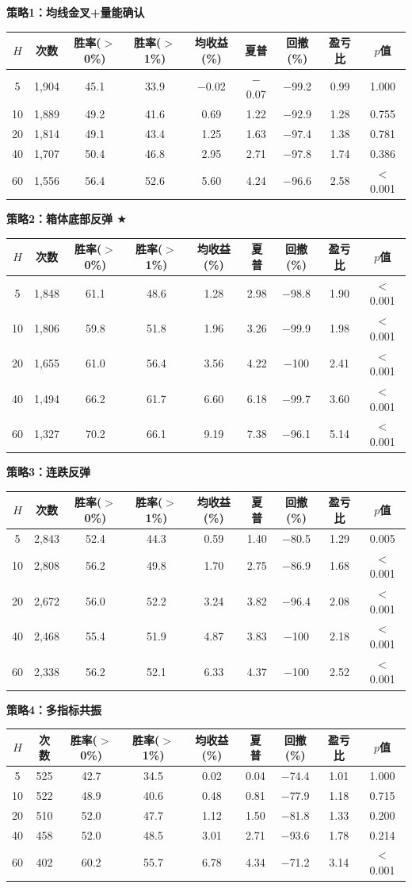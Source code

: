 \documentclass[12pt,a4paper]{ctexart}
\numberwithin{figure}{section}
\numberwithin{table}{section}
\begin{document}
\newcommand{\resulttable}[1]{%
\begin{center}
\scriptsize
\setlength{\tabcolsep}{3pt}
\begin{tabularx}{\textwidth}{c c c c c c c c c}
\toprule
$H$ & 次数 & 胜率($>$0\%) & 胜率($>$1\%) & 均收益(\%) & 夏普 & 回撤(\%) & 盈亏比 & $p$值 \\
\midrule
#1
\bottomrule
\end{tabularx}
\end{center}
}

\noindent\textbf{策略1：均线金叉+量能确认}
\resulttable{
5  & 1,904 & 45.1 & 33.9 & $-$0.02 & $-$0.07 & $-$99.2 & 0.99 & 1.000 \\
10 & 1,889 & 49.2 & 41.6 & 0.69 & 1.22 & $-$92.9 & 1.28 & 0.755 \\
20 & 1,814 & 49.1 & 43.4 & 1.25 & 1.63 & $-$97.4 & 1.38 & 0.781 \\
40 & 1,707 & 50.4 & 46.8 & 2.95 & 2.71 & $-$97.8 & 1.74 & 0.386 \\
60 & 1,556 & 56.4 & 52.6 & 5.60 & 4.24 & $-$96.6 & 2.58 & $<$0.001 \\
}

\noindent\textbf{策略2：箱体底部反弹 $\bigstar$}
\resulttable{
5  & 1,848 & 61.1 & 48.6 & 1.28 & 2.98 & $-$98.8 & 1.90 & $<$0.001 \\
10 & 1,806 & 59.8 & 51.8 & 1.96 & 3.26 & $-$99.9 & 1.98 & $<$0.001 \\
20 & 1,655 & 61.0 & 56.4 & 3.56 & 4.22 & $-$100  & 2.41 & $<$0.001 \\
40 & 1,494 & 66.2 & 61.7 & 6.60 & 6.18 & $-$99.7 & 3.60 & $<$0.001 \\
60 & 1,327 & 70.2 & 66.1 & 9.19 & 7.38 & $-$96.1 & 5.14 & $<$0.001 \\
}

\noindent\textbf{策略3：连跌反弹}
\resulttable{
5  & 2,843 & 52.4 & 44.3 & 0.59 & 1.40 & $-$80.5 & 1.29 & 0.005 \\
10 & 2,808 & 56.2 & 49.8 & 1.70 & 2.75 & $-$86.9 & 1.68 & $<$0.001 \\
20 & 2,672 & 56.0 & 52.2 & 3.24 & 3.82 & $-$96.4 & 2.08 & $<$0.001 \\
40 & 2,468 & 55.4 & 51.9 & 4.87 & 3.83 & $-$100  & 2.18 & $<$0.001 \\
60 & 2,338 & 56.2 & 52.1 & 6.33 & 4.37 & $-$100  & 2.52 & $<$0.001 \\
}

\noindent\textbf{策略4：多指标共振}
\resulttable{
5  & 525 & 42.7 & 34.5 & 0.02 & 0.04 & $-$74.4 & 1.01 & 1.000 \\
10 & 522 & 48.9 & 40.6 & 0.48 & 0.81 & $-$77.9 & 1.18 & 0.715 \\
20 & 510 & 52.0 & 47.7 & 1.12 & 1.50 & $-$81.8 & 1.33 & 0.200 \\
40 & 458 & 52.0 & 48.5 & 3.01 & 2.71 & $-$93.6 & 1.78 & 0.214 \\
60 & 402 & 60.2 & 55.7 & 6.78 & 4.34 & $-$71.2 & 3.14 & $<$0.001 \\
}
\end{document}
